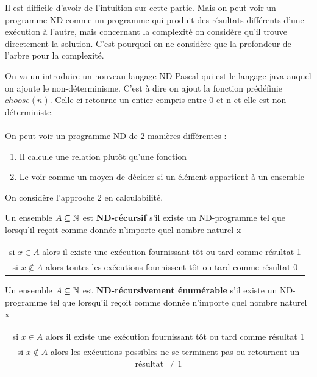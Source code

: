 \begin{myrem}
	Il est difficile d'avoir de l'intuition sur cette partie. Mais on peut 
	voir un programme ND comme un programme qui produit des résultats 
	différents d'une exécution à l'autre, mais concernant la complexité on 
	considère qu'il trouve directement la solution. C'est pourquoi on ne 
	considère que la profondeur de l'arbre pour la complexité.
\end{myrem}

On va un introduire un nouveau langage ND-Pascal qui est le langage java 
auquel on ajoute le non-déterminisme. C'est à dire on ajout la fonction 
prédéfinie $choose(n)$. Celle-ci retourne un entier compris entre 0 et n et elle 
est non déterministe.

\paragraph{} On peut voir un programme ND de 2 manières différentes :

\begin{enumerate}
	\item Il calcule une relation plutôt qu'une fonction
	\item Le voir comme un moyen de décider si un élément appartient à un 
		ensemble
\end{enumerate}

On considère l'approche 2 en calculabilité.

\begin{mydef}
	Un ensemble $A \subseteq \mathbb{N}$ est \textbf{ND-récursif} s’il existe un 
	ND-programme tel que lorsqu'il reçoit comme donnée n'importe quel nombre 
	naturel x \\
	\begin{tabular}{c}
	si $x \in A$ alors il existe une exécution fournissant tôt ou tard 
	comme résultat 1 \\
	si $x \notin A$ alors toutes les exécutions fournissent tôt ou tard 
	comme résultat 0 \\
	\end{tabular}
\end{mydef}

\begin{mydef}
	Un ensemble $A \subseteq \mathbb{N}$ est \textbf{ND-récursivement énumérable} s’il existe un 
	ND-programme tel que lorsqu'il reçoit comme donnée n'importe quel nombre 
	naturel x
	\begin{tabular}{c}
	si $x \in A$ alors il existe une exécution fournissant tôt ou tard 
	comme résultat 1 \\
	si $x \notin A$ alors les exécutions possibles ne se terminent pas ou 
	retournent un résultat $\neq 1$ \\
	\end{tabular}
\end{mydef}

